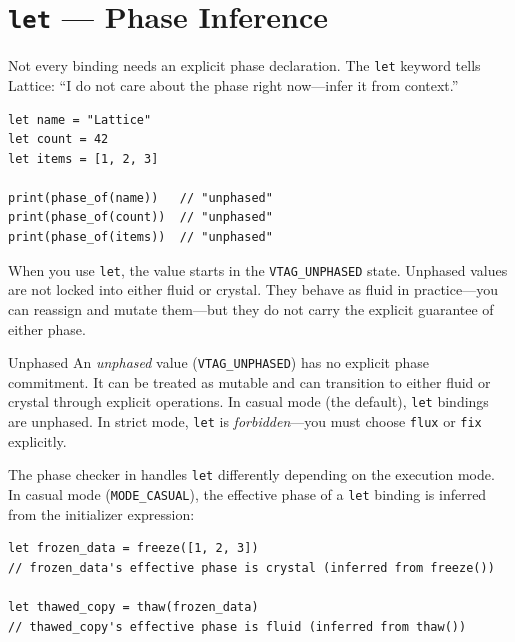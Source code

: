 
\section{\texttt{let} --- Phase Inference}\label{sec:let-inference}


Not every binding needs an explicit phase declaration.
The \lstinline|let| keyword tells Lattice: ``I do not care about the phase right now---infer it from context.''

\begin{lstlisting}[language=Lattice, caption={\texttt{let} bindings with inferred phase}]
let name = "Lattice"
let count = 42
let items = [1, 2, 3]

print(phase_of(name))   // "unphased"
print(phase_of(count))  // "unphased"
print(phase_of(items))  // "unphased"
\end{lstlisting}

When you use \lstinline|let|, the value starts in the \lstinline|VTAG_UNPHASED| state.
Unphased values are not locked into either fluid or crystal.
They behave as fluid in practice---you can reassign and mutate them---but they do not carry the explicit guarantee of either phase.

\begin{defnbox}{Unphased}
An \emph{unphased} value (\lstinline|VTAG_UNPHASED|) has no explicit phase commitment.
It can be treated as mutable and can transition to either fluid or crystal through explicit operations.
In casual mode (the default), \lstinline|let| bindings are unphased.
In strict mode, \lstinline|let| is \emph{forbidden}---you must choose \lstinline|flux| or \lstinline|fix| explicitly.
\end{defnbox}

The phase checker in  handles \lstinline|let| differently depending on the execution mode.
In casual mode (\lstinline|MODE_CASUAL|), the effective phase of a \lstinline|let| binding is inferred from the initializer expression:

\begin{lstlisting}[language=Lattice, caption={Phase inference with \texttt{let}}]
let frozen_data = freeze([1, 2, 3])
// frozen_data's effective phase is crystal (inferred from freeze())

let thawed_copy = thaw(frozen_data)
// thawed_copy's effective phase is fluid (inferred from thaw())
\end{lstlisting}

